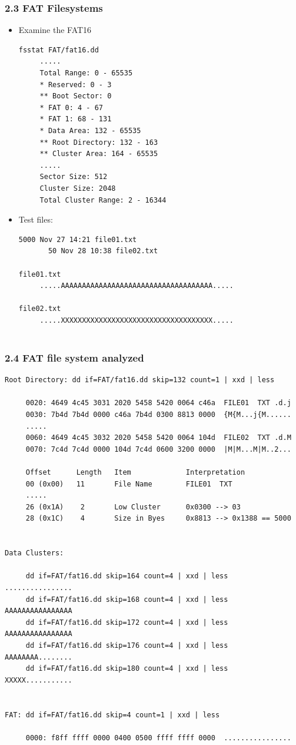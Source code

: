 \begin{frame}[fragile]
  \frametitle{2.3 FAT Filesystems}
    \begin{itemize}
	    \item Examine the FAT16
  \begin{lstlisting}[basicstyle=\tiny]
fsstat FAT/fat16.dd
     .....
     Total Range: 0 - 65535
     * Reserved: 0 - 3
     ** Boot Sector: 0
     * FAT 0: 4 - 67
     * FAT 1: 68 - 131
     * Data Area: 132 - 65535
     ** Root Directory: 132 - 163
     ** Cluster Area: 164 - 65535
     .....
     Sector Size: 512
     Cluster Size: 2048
     Total Cluster Range: 2 - 16344
  \end{lstlisting}
	    \item Test files:
  \begin{lstlisting}[basicstyle=\tiny]
     5000 Nov 27 14:21 file01.txt
       50 Nov 28 10:38 file02.txt

file01.txt
     .....AAAAAAAAAAAAAAAAAAAAAAAAAAAAAAAAAAAA.....
  
file02.txt
     .....XXXXXXXXXXXXXXXXXXXXXXXXXXXXXXXXXXXX.....
  
\end{lstlisting}
    \end{itemize}
\end{frame}


\begin{frame}[fragile]
  \frametitle{2.4 FAT file system analyzed}
  \begin{lstlisting}[basicstyle=\tiny]
Root Directory: dd if=FAT/fat16.dd skip=132 count=1 | xxd | less

     0020: 4649 4c45 3031 2020 5458 5420 0064 c46a  FILE01  TXT .d.j
     0030: 7b4d 7b4d 0000 c46a 7b4d 0300 8813 0000  {M{M...j{M......
     .....
     0060: 4649 4c45 3032 2020 5458 5420 0064 104d  FILE02  TXT .d.M
     0070: 7c4d 7c4d 0000 104d 7c4d 0600 3200 0000  |M|M...M|M..2...
 
     Offset      Length   Item             Interpretation
     00 (0x00)   11       File Name        FILE01  TXT
     .....
     26 (0x1A)    2       Low Cluster      0x0300 --> 03
     28 (0x1C)    4       Size in Byes     0x8813 --> 0x1388 == 5000


Data Clusters:

     dd if=FAT/fat16.dd skip=164 count=4 | xxd | less    ................
     dd if=FAT/fat16.dd skip=168 count=4 | xxd | less    AAAAAAAAAAAAAAAA
     dd if=FAT/fat16.dd skip=172 count=4 | xxd | less    AAAAAAAAAAAAAAAA
     dd if=FAT/fat16.dd skip=176 count=4 | xxd | less    AAAAAAAA........
     dd if=FAT/fat16.dd skip=180 count=4 | xxd | less    XXXXX...........


FAT: dd if=FAT/fat16.dd skip=4 count=1 | xxd | less

     0000: f8ff ffff 0000 0400 0500 ffff ffff 0000  ................
\end{lstlisting}
\end{frame}


